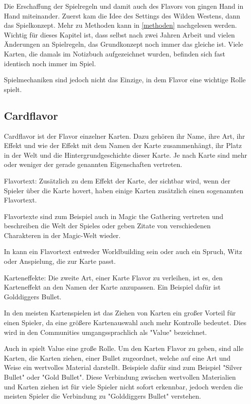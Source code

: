 Die Erschaffung der Spielregeln und damit auch des Flavors von \FF gingen Hand in Hand miteinander.
Zuerst kam die Idee des Settings des Wilden Westens, dann das Spielkonzept. Mehr zu Methoden kann in \ref{methoden}
nachgelesen werden. Wichtig für dieses Kapitel ist, dass selbst nach zwei Jahren Arbeit und vielen Änderungen an Spielregeln,
das Grundkonzept noch immer das gleiche ist. Viele Karten, die damals im Notizbuch aufgezeichnet wurden, befinden sich
fast identisch noch immer im Spiel.



Spielmechaniken sind jedoch nicht das Einzige, in dem Flavor eine wichtige Rolle spielt.

\subsection{Cardflavor}\label{subsec:cardflavor}

Cardflavor ist der Flavor einzelner Karten.
Dazu gehören ihr Name, ihre Art, ihr Effekt und wie der Effekt mit dem Namen der Karte zusammenhängt,
ihr Platz in der Welt und die Hintergrundgeschichte dieser Karte. Je nach Karte sind mehr oder weniger der gerade genannten
Eigenschaften vertreten.


Flavortext:
Zusätzlich zu dem Effekt der Karte, der sichtbar wird, wenn der Spieler über die Karte hovert, haben einige Karten zusätzlich einen sogenannten Flavortext.


Flavortexte sind zum Beispiel auch in Magic the Gathering vertreten und beschreiben die Welt der Spieles oder geben
Zitate von verschiedenen Charakteren in der Magic-Welt wieder. %


In \FF kann ein Flavortext entweder Worldbuilding sein oder auch ein Spruch, Witz oder Anspielung, die zur Karte passt.


Karteneffekte:
Die zweite Art, einer Karte Flavor zu verleihen, ist es, den Karteneffekt an den Namen der Karte anzupassen.
Ein Beispiel dafür ist Golddiggers Bullet.


In den meisten Kartenspielen ist das Ziehen von Karten ein großer Vorteil für einen Spieler, da eine größere Kartenauswahl
auch mehr Kontrolle bedeutet. Dies wird in den Communities umgangssprachlich als "Value" bezeichnet. 


Auch in \FF spielt Value eine große Rolle.
Um den Karten Flavor zu geben, sind alle Karten, die Karten ziehen, einer Bullet zugeordnet, welche auf eine Art und Weise ein wertvolles Material darstellt.
Beispiele dafür sind zum Beispiel "Silver Bullet" oder "Gold Bullet". Diese Verbindung zwischen wertvollen
Materialien und Karten ziehen ist für viele Spieler nicht sofort erkennbar, jedoch werden die meisten Spieler die Verbindung zu "Golddiggers Bullet" verstehen.


